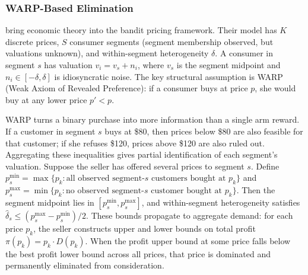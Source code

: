 \subsubsection{WARP-Based Elimination}

\citet{Misra2019} bring economic theory into the bandit pricing framework. Their model has $K$ discrete prices, $S$ consumer segments (segment membership observed, but valuations unknown), and within-segment heterogeneity $\delta$. A consumer in segment $s$ has valuation $v_i = v_s + n_i$, where $v_s$ is the segment midpoint and $n_i \in [-\delta, \delta]$ is idiosyncratic noise. The key structural assumption is WARP (Weak Axiom of Revealed Preference): if a consumer buys at price $p$, she would buy at any lower price $p' < p$.

WARP turns a binary purchase into more information than a single arm reward. If a customer in segment $s$ buys at \$80, then prices below \$80 are also feasible for that customer; if she refuses \$120, prices above \$120 are also ruled out. Aggregating these inequalities gives partial identification of each segment's valuation. Suppose the seller has offered several prices to segment $s$. Define $p_s^{\min} = \max\{p_k : \text{all observed segment-$s$ customers bought at } p_k\}$ and $p_s^{\max} = \min\{p_k : \text{no observed segment-$s$ customer bought at } p_k\}$. Then the segment midpoint lies in $[p_s^{\min}, p_s^{\max}]$, and within-segment heterogeneity satisfies $\hat{\delta}_s \leq (p_s^{\max} - p_s^{\min})/2$. These bounds propagate to aggregate demand: for each price $p_k$, the seller constructs upper and lower bounds on total profit $\pi(p_k) = p_k \cdot D(p_k)$. When the profit upper bound at some price falls below the best profit lower bound across all prices, that price is dominated and permanently eliminated from consideration.

